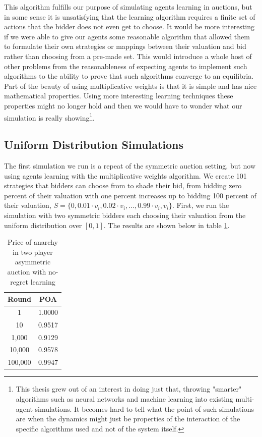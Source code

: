 \documentclass[12pt,twoside]{reedthesis}
\begin{document}
This algorithm fulfills our purpose of simulating agents learning in auctions, but in some sense it is unsatisfying that the learning algorithm requires a finite set of actions that the bidder does not even get to choose. It would be more interesting if we were able to give our agents some reasonable algorithm that allowed them to formulate their own strategies or mappings between their valuation and bid rather than choosing from a pre-made set. This would introduce a whole host of other problems from the reasonableness of expecting agents to implement such algorithms to the ability to prove that such algorithms converge to an equilibria. Part of the beauty of using multiplicative weights is that it is simple and has nice mathematical properties. Using more interesting learning techniques these properties might no longer hold and then we would have to wonder what our simulation is really showing\footnote{This thesis grew out of an interest in doing just that, throwing "smarter" algorithms such as neural networks and machine learning into existing multi-agent simulations. It becomes hard to tell what the point of such simulations are when the dynamics might just be properties of the interaction of the specific algorithms used and not of the system itself.}.

\subsection{Uniform Distribution Simulations}
The first simulation we run is a repeat of the symmetric auction setting, but now using agents learning with the multiplicative weights algorithm. We create 101 strategies that bidders can choose from to shade their bid, from bidding zero percent of their valuation with one percent increases up to bidding 100 percent of their valuation, $S = \{ 0, 0.01 \cdot v_i, 0.02 \cdot v_i, \ldots, 0.99 \cdot v_i, v_i \}$. First, we run the simulation with two symmetric bidders each choosing their valuation from the uniform distribution over $[0,1]$. The results are shown below in table \ref{table:3}.

\begin{table}[h!]
	\begin{center}
		\begin{tabular}{ |c|c| }
			\hline
			Round & POA \\
			\hline
			1 & 1.0000 \\
			10 & 0.9517 \\
			1,000 & 0.9129 \\
			10,000 & 0.9578 \\
			100,000 & 0.9947 \\
			\hline
		\end{tabular}
		\caption{Price of anarchy in two player asymmetric auction with no-regret learning}
		\label{table:3}
	\end{center} 
\end{table}
\end{document}
